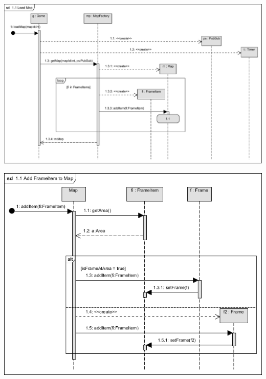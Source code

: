 		\begin{center}
			\includegraphics[scale=0.8]{resources/seq_1-0_newMap}
		\end{center}
	
		\begin{center}
			\includegraphics[scale=0.8]{resources/seq_1-1_addFrameItemToMap.png}
		\end{center}
	
